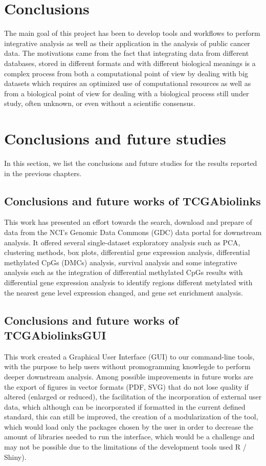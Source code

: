\section{Conclusions}


The main goal of this project has been to develop tools and workflows to perform integrative analysis as well as their application in the analysis of public cancer data. The motivations came from the fact that integrating data from different databases, stored in different formats and with different biological meanings is a complex process from both a computational point of view by dealing with big datasets which requires an optimized use of computational resources as well as from a biological point of view for dealing with a biological process still under study, often unknown, or even without a scientific consensus.

\section{Conclusions and future studies}

In this section, we list the conclusions and future studies for the results reported in the previous chapters.

\subsection{Conclusions and future works of TCGAbiolinks}

This work has presented an effort towards the search, download and
prepare of data from the NCI's Genomic Data Commons (GDC) data portal for
downstream analysis. It offered several single-dataset
exploratory analysis such as PCA, clustering methods, box plots,
 differential gene expression analysis, differential methylated CpGs (DMCs) analysis,
 survival analysis and some integrative analysis
 such as the integration of differential methylated CpGs results with  differential gene expression analysis
 to identify regions different metylated with the nearest gene level expression changed, and
 gene set enrichment analysis.


\subsection{Conclusions and future works of TCGAbiolinksGUI}

This work created a Graphical User Interface (GUI) to our command-line tools,
with the purpose to help users without promogramming knowlegde to perform
deeper downstream analysis. Among possible improvements in future works are
the export of figures in vector formats (PDF, SVG) that do not lose quality
if altered (enlarged or reduced), the facilitation of the incorporation of external
user data, which although can be incorporated if formatted in the current defined standard,
this can still be improved, the creation of a modularization of the tool, which would load only the packages chosen by the user in order to decrease the amount of libraries needed to run the interface, which
would be a challenge and may not be possible due to the limitations of the development tools used R / Shiny).

